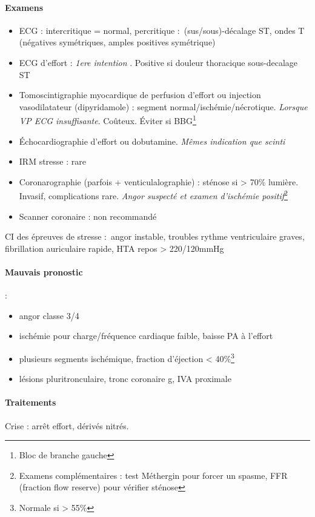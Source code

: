 \paragraph{Examens}
\begin{itemize}
  \item ECG : intercritique = normal, percritique : (sus/sous)-décalage
    ST, ondes T (négatives symétriques, amples positives symétrique)
  \item ECG d'effort : \textit{1ere intention} . Positive si douleur thoracique \lor{}
    sous-decalage ST
  \item Tomoscintigraphie myocardique de perfusion d'effort ou injection
    vasodilatateur (dipyridamole) : segment normal/ischémie/nécrotique.
    \textit{Lorsque VP ECG insuffisante}. Coûteux. Éviter si BBG\footnote{Bloc
    de branche gauche}
  \item Échocardiographie d'effort ou dobutamine. \textit{Mêmes indication que
    scinti} 
  \item IRM stresse : rare
  \item Coronarographie (parfois + venticulalographie) : sténose si > 70\%
    lumière. Invasif, complications rare. \textit{Angor suspecté et examen
    d'ischémie positif}\footnote{Examens complémentaires : test Méthergin pour
      forcer un spasme, FFR (fraction flow reserve) pour vérifier sténose}
  \item Scanner coronaire : non recommandé
\end{itemize}

\danger CI des épreuves de stresse : angor instable, troubles rythme ventriculaire
graves, fibrillation auriculaire rapide, HTA repos > 220/120mmHg

\paragraph{Mauvais pronostic} : 
\begin{itemize}
  \item angor classe 3/4
  \item ischémie pour charge/fréquence cardiaque faible, baisse PA à l'effort
  \item plusieurs segments ischémique, fraction d'éjection <
    40\%\footnote{Normale si > 55\%}
  \item lésions pluritronculaire, tronc coronaire g, IVA proximale
\end{itemize}

\paragraph{Traitements}
Crise : arrêt effort, dérivés nitrés.

